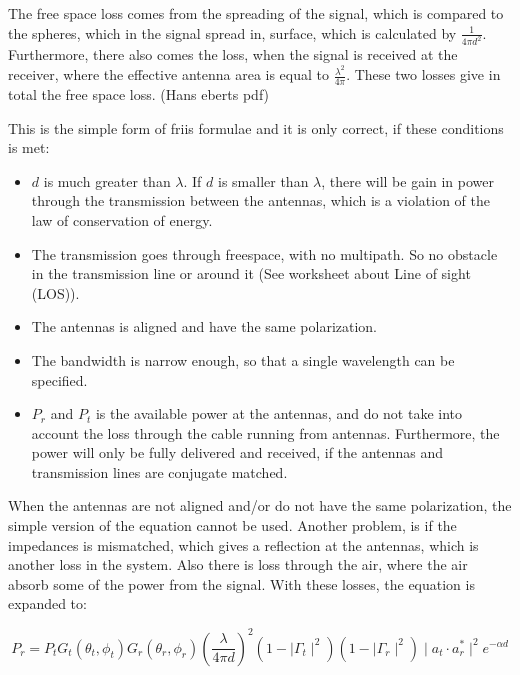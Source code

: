 The free space loss comes from the spreading of the signal, which is compared to the spheres, which in the signal spread in, surface, which is calculated by $\frac{1}{4 \pi d^2}$. Furthermore, there also comes the loss, when the signal is received at the receiver, where the effective antenna area is equal to $\frac{\lambda^2}{4 \pi}$. These two losses give in total the free space loss. (Hans eberts pdf)


This is the simple form of friis formulae and it is only correct, if these conditions is met:
\begin{itemize}
\item $d$ is much greater than $\lambda$. If $d$ is smaller than $\lambda$, there will be gain in power through the transmission between the antennas, which is a violation of the law of conservation of energy.
\item The transmission goes through freespace, with no multipath. So no obstacle in the transmission line or around it (See worksheet about Line of sight (LOS)).
\item The antennas is aligned and have the same polarization.
\item The bandwidth is narrow enough, so that a single wavelength can be specified.
\item $P_r$ and $P_t$ is the available power at the antennas, and do not take into account the loss through the cable running from antennas. Furthermore, the power will only be fully delivered and received, if the antennas and transmission lines are conjugate matched.
\end{itemize}


When the antennas are not aligned and/or do not have the same polarization, the simple version of the equation cannot be used. Another problem, is if the impedances is mismatched, which gives a reflection at the antennas, which is another loss in the system. Also there is loss through the air, where the air absorb some of the power from the signal. With these losses, the equation is expanded to:

\begin{equation}
P_r = P_t G_t(\theta_t, \phi_t) G_r(\theta_r, \phi_r) (\frac{\lambda}{4 \pi d})^2 (1 - \mid \Gamma_t \mid^2) (1 - \mid \Gamma_r \mid^2) \mid a_t \cdot a_r^* \mid^2 e^{- \alpha d}
\end{equation}
\begin{where}
\end{where}

